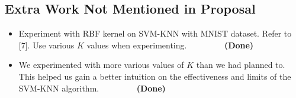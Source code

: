 \documentclass[11pt,letterpaper]{article}
\begin{document}
\subsection{Extra Work Not Mentioned in Proposal}

\begin{itemize}
\item Experiment with RBF kernel on SVM-KNN with MNIST dataset. Refer to [7]. Use various $K$ values when experimenting. $\>\>\>\>\>\>\>\>\>\>\>\>\>\>\>\>\>\>\>$\textbf{(Done)}

\item We experimented with more various values of $K$ than we had planned to. This helped us gain a better intuition on the effectiveness and limits of the SVM-KNN algorithm. $\>\>\>\>\>\>\>\>\>\>\>\>\>\>\>\>\>\>\>$\textbf{(Done)}

\end{itemize}
\end{document}
